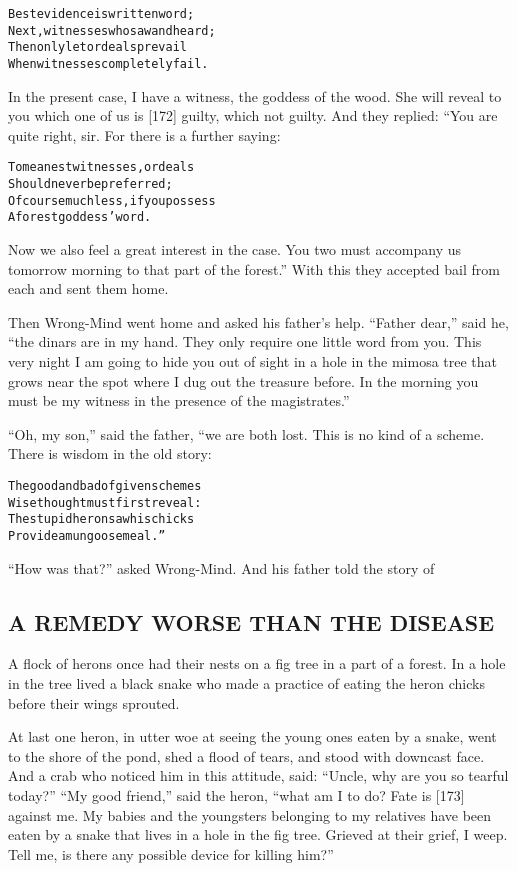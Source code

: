 \documentclass{article}
\renewenvironment{verbatim}{\begin{alltt}\normalfont\begin{centering}}{\end{centering}\end{alltt}}
\begin{document}
\begin{verbatim}
Best evidence is written word;
Next, witnesses who saw and heard;
Then only let ordeals prevail
When witnesses completely fail.
\end{verbatim}
In the present case, I have a witness, the goddess of the wood. She
will reveal to you which one of us is [172] guilty, which not
guilty. And they replied: “You are quite right, sir. For there is a
further saying:

\begin{verbatim}
To meanest witnesses, ordeals
    Should never be preferred;
Of course much less, if you possess
    A forest goddess' word.
\end{verbatim}
Now we also feel a great interest in the case. You two must
accompany us tomorrow morning to that part of the forest.” With
this they accepted bail from each and sent them home.

Then Wrong-Mind went home and asked his father's help.
``Father dear,'' said he,
``the dinars are in my hand. They only require one little word from you. This very night I am going to hide you out of sight in a hole in the mimosa tree that grows near the spot where I dug out the treasure before. In the morning you must be my witness in the presence of the magistrates.''

``Oh, my son,'' said the father, “we are both lost. This is no kind
of a scheme. There is wisdom in the old story:

\begin{verbatim}
The good and bad of given schemes
    Wise thought must first reveal:
The stupid heron saw his chicks
    Provide a mungoose meal.”
\end{verbatim}
``How was that?'' asked Wrong-Mind. And his father told the story
of

\subsection{A REMEDY WORSE THAN THE DISEASE}

A flock of herons once had their nests on a fig tree in a part of a
forest. In a hole in the tree lived a black snake who made a
practice of eating the heron chicks before their wings sprouted.

At last one heron, in utter woe at seeing the young ones eaten by a
snake, went to the shore of the pond, shed a flood of tears, and
stood with downcast face. And a crab who noticed him in this
attitude, said: ``Uncle, why are you so tearful today?''
``My good friend,'' said the heron,
``what am I to do? Fate is [173] against me. My babies and the youngsters belonging to my relatives have been eaten by a snake that lives in a hole in the fig tree. Grieved at their grief, I weep. Tell me, is there any possible device for killing him?''
\end{document}
